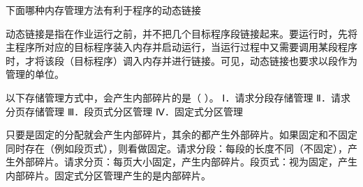 \question 下面哪种内存管理方法有利于程序的动态链接
\par{}
\begin{solution}动态链接是指在作业运行之前，并不把几个目标程序段链接起来。要运行时，先将主程序所对应的目标程序装入内存并启动运行，当运行过程中又需要调用某段程序时，才将该段（目标程序）调入内存并进行链接。可见，动态链接也要求以段作为管理的单位。
\end{solution}
\question 以下存储管理方式中，会产生内部碎片的是（ ）。 Ⅰ．请求分段存储管理
Ⅱ．请求分页存储管理 Ⅲ．段页式分区管理 Ⅳ．固定式分区管理
\par{}
\begin{solution}只要是固定的分配就会产生内部碎片，其余的都产生外部碎片。如果固定和不固定同时存在（例如段页式），则看做固定。请求分段：每段的长度不同（不固定），产生外部碎片。请求分页：每页大小固定，产生内部碎片。段页式：视为固定，产生内部碎片。固定式分区管理产生的是内部碎片。
\end{solution}
